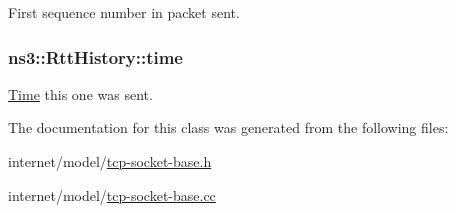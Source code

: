 First sequence number in packet sent. 

\subsubsection[{\texorpdfstring{time}{time}}]{ ns3\+::\+Rtt\+History\+::time}\hypertarget{classns3_1_1RttHistory_ab1dedd70854fa8dd017f4c9b10ce4c51}{}\label{classns3_1_1RttHistory_ab1dedd70854fa8dd017f4c9b10ce4c51}


\hyperlink{classns3_1_1Time}{Time} this one was sent. 



The documentation for this class was generated from the following files\+:\begin{DoxyCompactItemize}
\item 
internet/model/\hyperlink{tcp-socket-base_8h}{tcp-\/socket-\/base.\+h}\item 
internet/model/\hyperlink{tcp-socket-base_8cc}{tcp-\/socket-\/base.\+cc}\end{DoxyCompactItemize}
